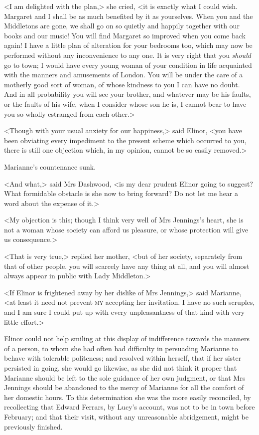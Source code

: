 <I am delighted with the plan,> she cried, <it is exactly what I could wish. Margaret and I shall be as much benefited by it as yourselves. When you and the Middletons are gone, we shall go on so quietly and happily together with our books and our music! You will find Margaret so improved when you come back again! I have a little plan of alteration for your bedrooms too, which may now be performed without any inconvenience to any one. It is very right that you \textit{should} go to town; I would have every young woman of your condition in life acquainted with the manners and amusements of London. You will be under the care of a motherly good sort of woman, of whose kindness to you I can have no doubt. And in all probability you will see your brother, and whatever may be his faults, or the faults of his wife, when I consider whose son he is, I cannot bear to have you so wholly estranged from each other.>

<Though with your usual anxiety for our happiness,> said Elinor, <you have been obviating every impediment to the present scheme which occurred to you, there is still one objection which, in my opinion, cannot be so easily removed.>

Marianne's countenance sunk.

<And what,> said Mrs Dashwood, <is my dear prudent Elinor going to suggest? What formidable obstacle is she now to bring forward? Do not let me hear a word about the expense of it.>

<My objection is this; though I think very well of Mrs Jennings's heart, she is not a woman whose society can afford us pleasure, or whose protection will give us consequence.>

<That is very true,> replied her mother, <but of her society, separately from that of other people, you will scarcely have any thing at all, and you will almost always appear in public with Lady Middleton.>

<If Elinor is frightened away by her dislike of Mrs Jennings,> said Marianne, <at least it need not prevent \textsc{my} accepting her invitation. I have no such scruples, and I am sure I could put up with every unpleasantness of that kind with very little effort.>

Elinor could not help smiling at this display of indifference towards the manners of a person, to whom she had often had difficulty in persuading Marianne to behave with tolerable politeness; and resolved within herself, that if her sister persisted in going, she would go likewise, as she did not think it proper that Marianne should be left to the sole guidance of her own judgment, or that Mrs Jennings should be abandoned to the mercy of Marianne for all the comfort of her domestic hours. To this determination she was the more easily reconciled, by recollecting that Edward Ferrars, by Lucy's account, was not to be in town before February; and that their visit, without any unreasonable abridgement, might be previously finished.


